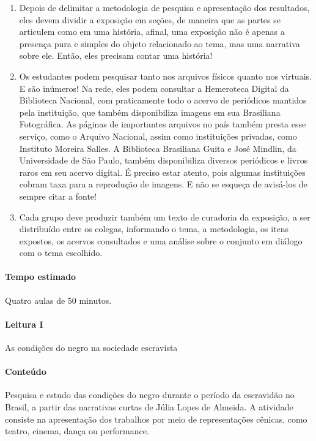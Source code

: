 \documentclass[12pt]{extarticle}
\begin{document}
\begin{enumerate}
\item
Depois de delimitar a metodologia de pesquisa e apresentação dos
resultados, eles devem dividir a exposição em seções, de maneira que as
partes se articulem como em uma história, afinal, uma exposição não é
apenas a presença pura e simples do objeto relacionado ao tema, mas uma
narrativa sobre ele. Então, eles precisam contar uma história!

\item
Os estudantes podem pesquisar tanto nos arquivos físicos quanto nos
virtuais. E são inúmeros! Na rede, eles podem consultar a Hemeroteca
Digital da Biblioteca Nacional, com praticamente todo o acervo de
periódicos mantidos pela instituição, que também disponibiliza imagens
em sua Brasiliana Fotográfica. As páginas de importantes arquivos no
país também presta esse serviço, como o Arquivo Nacional, assim como
instituições privadas, como Instituto Moreira Salles. A Biblioteca
Brasiliana Guita e José Mindlin, da Universidade de São Paulo, também
disponibiliza diversos periódicos e livros raros em seu acervo digital.
É preciso estar atento, pois algumas instituições cobram taxa para a reprodução
de imagens. E não se esqueça de avisá-los de sempre citar a fonte!

\item
Cada grupo deve produzir também um texto de curadoria da exposição, a
ser distribuído entre os colegas, informando o tema, a metodologia, os
itens expostos, os acervos consultados e uma análise sobre o conjunto em
diálogo com o tema escolhido.
\end{enumerate}

\paragraph{Tempo estimado} Quatro aulas de 50 minutos.



\paragraph{Leitura I} As condições do negro na sociedade escravista



\paragraph{Conteúdo} Pesquisa e estudo das condições do negro durante o
período da escravidão no Brasil, a partir das narrativas curtas de Júlia
Lopes de Almeida. A atividade consiste na apresentação dos trabalhos por
meio de representações cênicas, como teatro, cinema, dança ou
performance.
\end{document}
